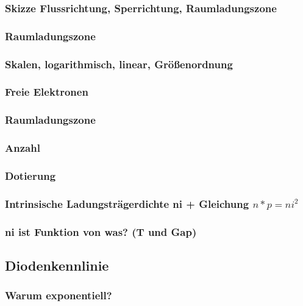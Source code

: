 \documentclass{article}
\begin{document}
	
	\subsubsection{Skizze Flussrichtung, Sperrichtung, Raumladungszone}
	\subsubsection{Raumladungszone}
	\subsubsection{Skalen, logarithmisch, linear, Größenordnung}
	\subsubsection{Freie Elektronen}
	\subsubsection{Raumladungszone}
	\subsubsection{Anzahl}
	\subsubsection{Dotierung}
	
	\subsubsection{Intrinsische Ladungsträgerdichte ni + Gleichung $n*p=ni^2$ }
	\subsubsection{ni ist Funktion von was? (T und Gap)}
	
\subsection{Diodenkennlinie}\label{k5:diode}
    \subsubsection{Warum exponentiell?}
\end{document}
